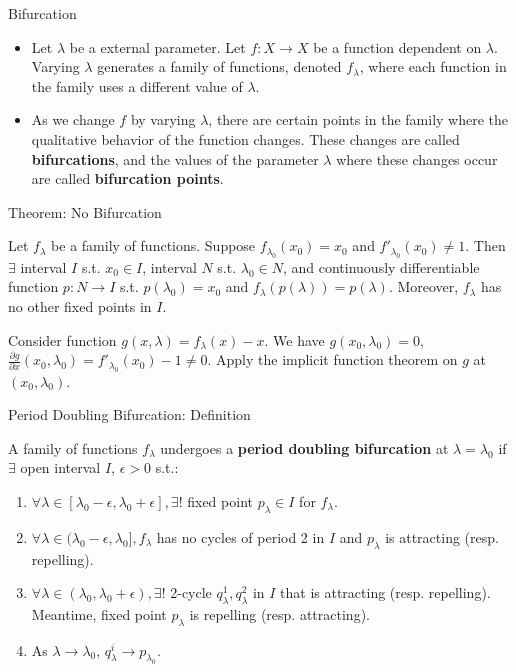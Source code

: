 \documentclass[aspectratio=169]{beamer}
\begin{document}
\begin{frame}{Bifurcation}
\begin{itemize}
    \item Let $\lambda$ be a external parameter. Let $f:X\rightarrow X$ be a function dependent on $\lambda$. Varying $\lambda$ generates a family of functions, denoted $f_\lambda$, where each function in the family uses a different value of $\lambda$. 
    \item As we change $f$ by varying $\lambda$, there are certain points in the family where the qualitative behavior of the function changes. These changes are called \textbf{bifurcations}, and the values of the parameter $\lambda$ where these changes occur are called \textbf{bifurcation points}.
\end{itemize}
\end{frame}

\begin{frame}{Theorem: No Bifurcation}
\begin{thrm}
    Let $f_\lambda$ be a family of functions. Suppose $f_{\lambda_0}(x_0)=x_0$ and $f'_{\lambda_0}(x_0) \neq 1$. Then $\exists$ interval $I$ s.t. $x_0 \in I$, interval $N$ s.t. $\lambda_0 \in N$, and continuously differentiable function $p: N\rightarrow I$ s.t. $p(\lambda_0) = x_0$ and $f_\lambda(p(\lambda)) = p(\lambda)$. Moreover, $f_\lambda$ has no other fixed points in $I$.
\end{thrm}
\begin{pf}
    Consider function $g(x,\lambda) = f_\lambda(x)-x$. We have $g(x_0, \lambda_0)=0$, $\frac{\partial g}{\partial x}(x_0,\lambda_0) = f'_{\lambda_0}(x_0)-1 \neq 0$. Apply the implicit function theorem on $g$ at $(x_0, \lambda_0)$.
\end{pf}
\end{frame}

\begin{frame}{Period Doubling Bifurcation: Definition}
\begin{defn}
    A family of functions $f_\lambda$ undergoes a \textbf{period doubling bifurcation} at $\lambda = \lambda_0$ if $\exists$ open interval $I$, $\epsilon >0$ s.t.: 
    \begin{enumerate}
        \item $\forall \lambda \in [\lambda_0-\epsilon, \lambda_0+\epsilon], \exists !$ fixed point $p_\lambda \in I$ for $f_\lambda$.
        \item $\forall \lambda \in (\lambda_0-\epsilon, \lambda_0], f_\lambda$ has no cycles of period 2 in $I$ and $p_\lambda$ is attracting (resp. repelling). 
        \item $\forall \lambda \in (\lambda_0, \lambda_0+\epsilon), \exists !$ 2-cycle $q_\lambda^1, q_\lambda^2$ in $I$ that is attracting (resp. repelling). Meantime, fixed point $p_\lambda$ is repelling (resp. attracting). 
        \item As $\lambda\rightarrow\lambda_0$, $q_\lambda^i \rightarrow p_{\lambda_0}$.
    \end{enumerate}
\end{defn}
\end{frame}
\end{document}
